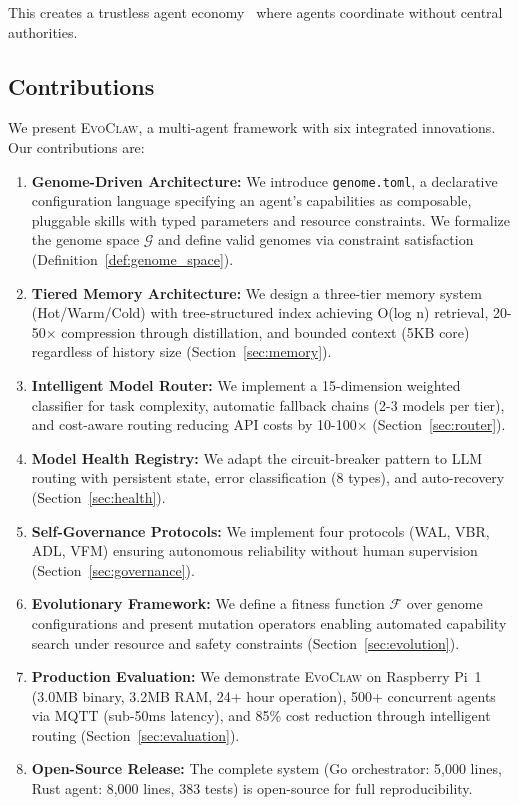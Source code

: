 \documentclass{article}
\newcommand{\evoclaw}{\textsc{EvoClaw}}
\newcommand{\genome}{\texttt{genome.toml}}
\newcommand{\fitnessfn}{\mathcal{F}}
\newcommand{\genomespace}{\mathcal{G}}
\begin{document}
This creates a trustless agent economy~\cite{buterin2014ethereum} where agents coordinate without central authorities.

\subsection{Contributions}

We present \evoclaw{}, a multi-agent framework with six integrated innovations. Our contributions are:

\begin{enumerate}[leftmargin=*]
    \item \textbf{Genome-Driven Architecture:} We introduce \genome{}, a declarative configuration language specifying an agent's capabilities as composable, pluggable skills with typed parameters and resource constraints. We formalize the genome space $\genomespace$ and define valid genomes via constraint satisfaction (Definition~\ref{def:genome_space}).
    
    \item \textbf{Tiered Memory Architecture:} We design a three-tier memory system (Hot/Warm/Cold) with tree-structured index achieving O(log n) retrieval, 20-50$\times$ compression through distillation, and bounded context (5KB core) regardless of history size (Section~\ref{sec:memory}).
    
    \item \textbf{Intelligent Model Router:} We implement a 15-dimension weighted classifier for task complexity, automatic fallback chains (2-3 models per tier), and cost-aware routing reducing API costs by 10-100$\times$ (Section~\ref{sec:router}).
    
    \item \textbf{Model Health Registry:} We adapt the circuit-breaker pattern to LLM routing with persistent state, error classification (8 types), and auto-recovery (Section~\ref{sec:health}).
    
    \item \textbf{Self-Governance Protocols:} We implement four protocols (WAL, VBR, ADL, VFM) ensuring autonomous reliability without human supervision (Section~\ref{sec:governance}).
    
    \item \textbf{Evolutionary Framework:} We define a fitness function $\fitnessfn$ over genome configurations and present mutation operators enabling automated capability search under resource and safety constraints (Section~\ref{sec:evolution}).
    
    \item \textbf{Production Evaluation:} We demonstrate \evoclaw{} on Raspberry Pi~1 (3.0MB binary, 3.2MB RAM, 24+ hour operation), 500+ concurrent agents via MQTT (sub-50ms latency), and 85\% cost reduction through intelligent routing (Section~\ref{sec:evaluation}).
    
    \item \textbf{Open-Source Release:} The complete system (Go orchestrator: 5,000 lines, Rust agent: 8,000 lines, 383 tests) is open-source for full reproducibility.
\end{enumerate}
\end{document}
